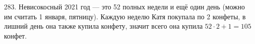 283. Невисокосный 2021 год --- это 52 полных недели и ещё один день (можно им считать 1 января, пятницу). Каждую неделю Катя покупала по 2 конфеты, в лишний день она также купила конфету, значит всего она купила $52\cdot2+1=105$ конфет.\\
